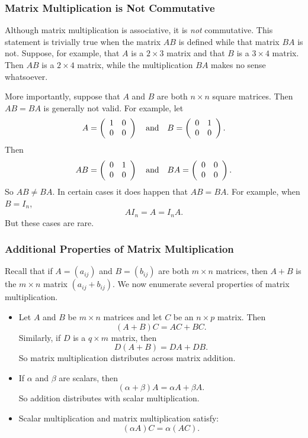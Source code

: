 \documentclass{ximera}
\begin{document}
\subsubsection*{Matrix Multiplication is Not Commutative}

Although matrix multiplication is associative, it is {\em not\/}
commutative. This statement is trivially true when the matrix
$AB$ is defined while that matrix $BA$ is not.  Suppose, for
example, that $A$ is a $2\times 3$ matrix and that $B$ is a
$3\times 4$ matrix.  Then $AB$ is a $2\times 4$ matrix, while
the multiplication $BA$ makes no sense whatsoever.

More importantly, suppose that $A$ and $B$ are both $n\times n$
square matrices.  Then $AB=BA$ is generally not valid.  For
example, let
\[
A=\left(\begin{array}{cc} 1 & 0 \\ 0 & 0 \end{array}\right) \quad\mbox{and}\quad
B =\left(\begin{array}{cc} 0 & 1 \\ 0 & 0 \end{array}\right).
\]
Then
\[
AB =\left(\begin{array}{cc} 0 & 1 \\ 0 & 0 \end{array}\right)
\quad\mbox{and}\quad BA=\left(\begin{array}{cc} 0 & 0 \\ 0 & 0 \end{array}\right).
\]
So $AB\neq BA$.  In certain cases it does happen that $AB=BA$.
For example, when $B=I_n$,
\[
AI_n = A = I_nA.
\]
But these cases are rare.

\subsubsection*{Additional Properties of Matrix Multiplication}

Recall that if $A=(a_{ij})$ and $B=(b_{ij})$ are both $m\times n$ 
matrices, then $A+B$ is the $m\times n$ matrix $(a_{ij}+b_{ij})$. 
We now enumerate several properties of matrix multiplication.

\begin{itemize}

\item	Let $A$ and $B$ be $m\times n$ matrices and let $C$ be an $n\times p$
matrix.  Then
\[
(A+B)C = AC + BC.
\]
Similarly, if $D$ is a $q\times m$ matrix, then
\[
D(A+B) = DA + DB.
\]
So matrix multiplication distributes across matrix addition.

\item	If $\alpha$ and $\beta$ are scalars, then
\[
(\alpha+\beta)A = \alpha A + \beta A.
\]
So addition distributes with scalar multiplication.

\item	Scalar multiplication and matrix multiplication satisfy:
\[
(\alpha A)C = \alpha (AC).
\]
\end{itemize}
\end{document}

